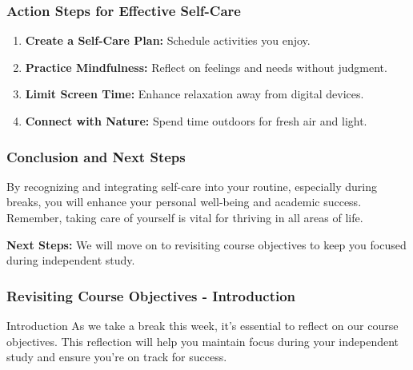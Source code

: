 \documentclass[aspectratio=169]{beamer}
\begin{document}
\begin{frame}[fragile]
    \frametitle{Action Steps for Effective Self-Care}
    \begin{enumerate}
        \item \textbf{Create a Self-Care Plan:} Schedule activities you enjoy.
        \item \textbf{Practice Mindfulness:} Reflect on feelings and needs without judgment.
        \item \textbf{Limit Screen Time:} Enhance relaxation away from digital devices.
        \item \textbf{Connect with Nature:} Spend time outdoors for fresh air and light.
    \end{enumerate}
\end{frame}

\begin{frame}[fragile]
    \frametitle{Conclusion and Next Steps}
    By recognizing and integrating self-care into your routine, especially during breaks, you will enhance your personal well-being and academic success. Remember, taking care of yourself is vital for thriving in all areas of life.
    
    \textbf{Next Steps:} We will move on to revisiting course objectives to keep you focused during independent study.
\end{frame}

\begin{frame}[fragile]
    \frametitle{Revisiting Course Objectives - Introduction}
    \begin{block}{Introduction}
        As we take a break this week, it’s essential to reflect on our course objectives. This reflection will help you maintain focus during your independent study and ensure you're on track for success.
    \end{block}
\end{frame}
\end{document}
